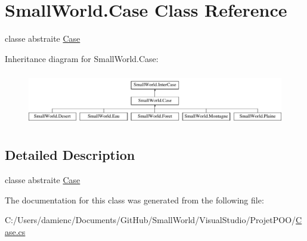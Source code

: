 \hypertarget{class_small_world_1_1_case}{\section{Small\-World.\-Case Class Reference}
\label{class_small_world_1_1_case}
}


classe abstraite \hyperlink{class_small_world_1_1_case}{Case}  


Inheritance diagram for Small\-World.\-Case\-:\begin{figure}[H]
\begin{center}
\leavevmode
\includegraphics[height=2.349650cm]{class_small_world_1_1_case}
\end{center}
\end{figure}


\subsection{Detailed Description}
classe abstraite \hyperlink{class_small_world_1_1_case}{Case} 

The documentation for this class was generated from the following file\-:\begin{DoxyCompactItemize}
\item 
C\-:/\-Users/damienc/\-Documents/\-Git\-Hub/\-Small\-World/\-Visual\-Studio/\-Projet\-P\-O\-O/\hyperlink{_case_8cs}{Case.\-cs}\end{DoxyCompactItemize}
